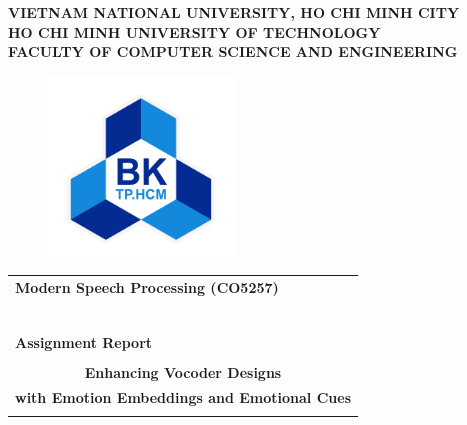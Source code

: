 \documentclass[12pt,a4paper]{article}
\begin{document}
\begin{titlepage}

    \begin{center}
        \large \textbf{VIETNAM NATIONAL UNIVERSITY, HO CHI MINH CITY} \\
        \large \textbf{HO CHI MINH UNIVERSITY OF TECHNOLOGY} \\
        \large \textbf{FACULTY OF COMPUTER SCIENCE AND ENGINEERING}
    \end{center}

    \begin{figure}[h!]
        \begin{center}
            \includegraphics[width=5cm]{Images/hcmut.png}
        \end{center}
    \end{figure}

    \begin{center}
        \begin{tabular}{c}
        \multicolumn{1}{l}{\textbf{{\Large Modern Speech Processing
        (CO5257)}}}\\
        ~~\\
        \hline
        \\
        \multicolumn{1}{l}{\textbf{{\Large Assignment Report}}}\\
        \\
        \textbf{{\Large Enhancing Vocoder Designs }}\\
        \textbf{{\Large with Emotion Embeddings and Emotional Cues}}\\
        \\
        \hline
        \end{tabular}
        \end{center}


\end{titlepage}
\end{document}
